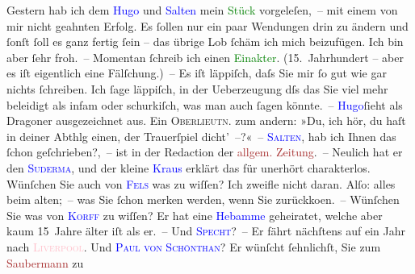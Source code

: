            \pstart
           {\pb}Gestern hab ich dem \textcolor{blue}{Hugo}{}\ledrightnote{\textcolor{blue}{Hugo von Hofmannsthal}} und \textcolor{blue}{Salten}{}\ledrightnote{\textcolor{blue}{Felix Salten}} mein \textcolor{green}{Stück}{} vorgeleſen, – mit einem von mir nicht
               geahnten Erfolg. Es ſollen nur ein paar Wendungen drin zu ändern und ſonſt ſoll es
               ganz fertig ſein – das übrige Lob ſchäm ich mich beizufügen. Ich bin aber ſehr
               froh. – Momentan ſchreib ich {\pb}einen \textcolor{green}{Einakter}{}. (15. Jahrhundert – aber es iſt
               eigentlich eine Fälſchung.) –\pend
           \pstart
           Es iſt läppiſch, daſs Sie mir ſo gut wie gar nichts ſchreiben. Ich ſage läppiſch, in
               der Ueberzeugung dſs das Sie viel mehr beleidigt als infam oder schurkiſch, was man
               auch ſagen könnte. – \textcolor{blue}{Hugo}{}\ledrightnote{\textcolor{blue}{Hugo von Hofmannsthal}}{ }ſieht als Dragoner {\pb}ausgezeichnet aus. Ein \textsc{Oberlieutn}. zum andern: »Du, ich
               hör, du haſt in deiner Abthlg einen, der Trauerſpiel dicht’ –?« –\pend
           \pstart
           \textcolor{blue}{\textsc{Salten}}{}\ledrightnote{\textcolor{blue}{Felix Salten}}, hab ich Ihnen das ſchon geſchrieben?, – ist in der Redaction der \textcolor{brown}{allgem. Zeitung}{}\ledrightnote{\textcolor{brown}{Wiener Allgemeine Zeitung}}. – Neulich hat er den \textcolor{blue}{\textsc{Suderma{\geminationn}}}{}\ledrightnote{\textcolor{blue}{Hermann Sudermann}}{ }\label{K_L00382_2v}\label{K_L00382_2h},
               und der kleine \textcolor{blue}{Kraus}{}\ledrightnote{\textcolor{blue}{Karl Kraus}} erklärt das für unerhört
               charakterlos.\pend
           \pstart
           {\pb}Wünſchen Sie auch von \textcolor{blue}{\textsc{Fels}}{}\ledrightnote{\textcolor{blue}{Friedrich Michael Fels}} was zu wiſſen? Ich zweifle nicht daran. Alſo: alles beim alten; – was Sie ſchon
               merken werden, wenn Sie zurückko{\geminationm}en. – Wünſchen Sie was
               von \textcolor{blue}{\textsc{Korff}}{}\ledrightnote{\textcolor{blue}{Heinrich von Korff}} zu wiſſen? Er hat eine \textcolor{blue}{Hebamme}{} geheiratet, welche aber kaum 15 Jahre älter iſt als er. – Und \textcolor{blue}{\textsc{Specht}}{}\ledrightnote{\textcolor{blue}{Richard Specht}}? – Er fährt nächſtens {\pb}auf ein Jahr nach \textcolor{pink}{\textsc{Liverpool}}{}\ledrightnote{\textcolor{pink}{Liverpool}}. Und \textcolor{blue}{\textsc{Paul von Schönthan}}{}\ledrightnote{\textcolor{blue}{Richard Specht}}? Er wünſcht ſehnlichſt, Sie zum \textcolor{brown}{Saubermann}{}\ledrightnote{\textcolor{brown}{Saubermänner}} zu
